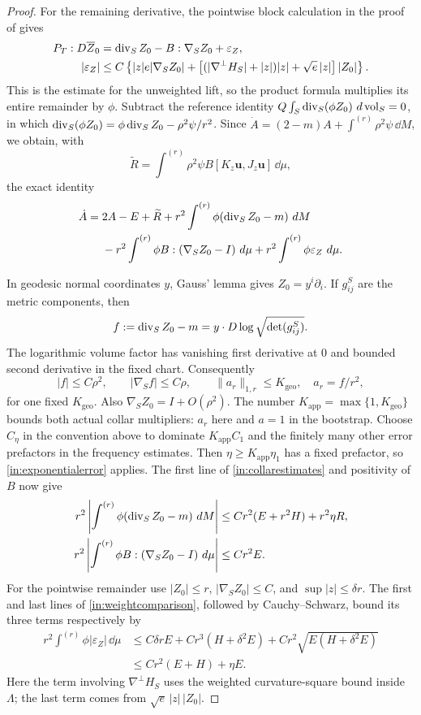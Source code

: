 \begin{proof}
For the remaining derivative, the pointwise block calculation in the
proof of  gives
\[
 \begin{split}
 P_T:D\overline Z_0
 &=\operatorname{div}_SZ_0-B:\nabla_SZ_0+\varepsilon_Z,\\
 |\varepsilon_Z|
 &\leq C\left\{|z|e|\nabla_SZ_0|
  +\left[(|\nabla^\perp H_S|+|z|)|z|+\sqrt e\,|z|\right]|Z_0|\right\}.
 \end{split}
\]
This is the estimate for the unweighted lift, so the product formula
multiplies its entire remainder by $\phi$.  Subtract the reference
identity $Q\int_S\operatorname{div}_S(\phi Z_0)\,\mathop{}\!d\operatorname{vol}_S=0$, in which
$\operatorname{div}_S(\phi Z_0)=\phi\operatorname{div}_SZ_0-\rho^2\psi/r^2$.  Since
$\dot A=(2-m)A+\int^{(r)}\rho^2\psi\,\dd M$, we obtain, with
\[
 \widetilde R=\int^{(r)}\rho^2\psi
                  B[K_z\mathbf u,J_z\mathbf u]\,\dd\mu,
\]
the exact identity
\begin{equation}\label{in:horizontalidentity}
 \begin{split}
 \dot A={}&2A-E+\widetilde R
   +r^2\int^{(r)}\phi(\operatorname{div}_SZ_0-m)\,\mathop{}\!d M\\
 &-r^2\int^{(r)}\phi B:(\nabla_SZ_0-I)\,\mathop{}\!d\mu
   +r^2\int^{(r)}\phi\varepsilon_Z\,\mathop{}\!d\mu.
 \end{split}
\end{equation}

In geodesic normal coordinates $y$, Gauss' lemma gives
$Z_0=y^i\partial_i$.  If $g^S_{ij}$ are the metric components, then
\[
 f:=\operatorname{div}_SZ_0-m=y\cdot D\log\sqrt{\det(g^S_{ij})}.
\]
The logarithmic volume factor has vanishing first derivative at $0$
and bounded second derivative in the fixed chart.  Consequently
\[
 |f|\leq C\rho^2,\qquad |\nabla_Sf|\leq C\rho,
 \qquad \|a_r\|_{1,r}\leq K_{\mathrm{geo}},\quad a_r=f/r^2,
\]
for one fixed $K_{\mathrm{geo}}$.  Also
$\nabla_SZ_0=I+O(\rho^2)$.  The number
$K_{\mathrm{app}}=\max\{1,K_{\mathrm{geo}}\}$ bounds both actual
collar multipliers: $a_r$ here and $a=1$ in the bootstrap.  Choose
$C_\eta$ in the convention above to dominate $K_{\mathrm{app}}C_1$
and the finitely many other error prefactors in the frequency estimates.
Then $\eta\geq K_{\mathrm{app}}\eta_1$ has a fixed prefactor, so
\eqref{in:exponentialerror} applies.  The first line of
\eqref{in:collarestimates} and positivity of $B$ now give
\[
 \begin{split}
 r^2\left|\int^{(r)}\phi(\operatorname{div}_SZ_0-m)\,\mathop{}\!d M\right|
   &\leq Cr^2(E+r^2H)+r^2\eta R,\\
 r^2\left|\int^{(r)}\phi B:(\nabla_SZ_0-I)\,\mathop{}\!d\mu\right|
   &\leq Cr^2E.
 \end{split}
\]
For the pointwise remainder use $|Z_0|\leq r$,
$|\nabla_SZ_0|\leq C$, and $\sup|z|\leq\delta r$.  The first
and last lines of \eqref{in:weightcomparison}, followed by
Cauchy--Schwarz, bound its three terms respectively by
\[
 \begin{split}
 r^2\int^{(r)}\phi|\varepsilon_Z|\,\dd\mu
 &\leq C\delta rE+Cr^3(H+\delta^2E)
                  +Cr^2\sqrt{E(H+\delta^2E)}\\
 &\leq Cr^2(E+H)+\eta E.
 \end{split}
\]
Here the term involving $\nabla^\perp H_S$ uses the weighted
curvature-square bound inside $\Lambda$; the last term comes from
$\sqrt e\,|z|\,|Z_0|$.


\end{proof}
